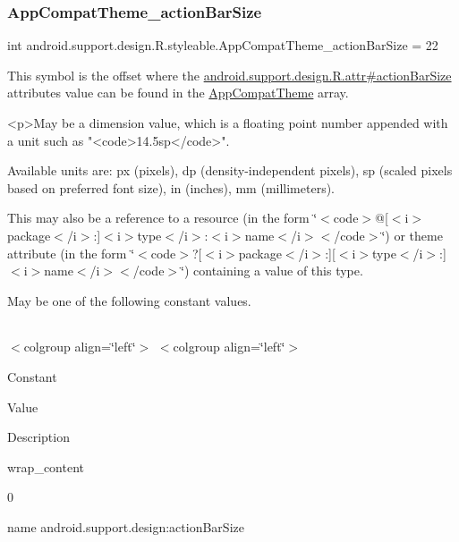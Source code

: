\subsubsection{\texorpdfstring{App\+Compat\+Theme\+\_\+action\+Bar\+Size}{AppCompatTheme\_actionBarSize}}
{\footnotesize\ttfamily int android.\+support.\+design.\+R.\+styleable.\+App\+Compat\+Theme\+\_\+action\+Bar\+Size = 22\hspace{0.3cm}{\ttfamily [static]}}

This symbol is the offset where the \hyperlink{classandroid_1_1support_1_1design_1_1R_1_1attr_ad892efeaa3b9e4b0892ccc04c1e42f6a}{android.\+support.\+design.\+R.\+attr\#action\+Bar\+Size} attribute\textquotesingle{}s value can be found in the \hyperlink{classandroid_1_1support_1_1design_1_1R_1_1styleable_afb351dc8de20cbd4c89abe360373010c}{App\+Compat\+Theme} array.

\begin{DoxyVerb}      <p>May be a dimension value, which is a floating point number appended with a unit such as "<code>14.5sp</code>".
\end{DoxyVerb}
 Available units are\+: px (pixels), dp (density-\/independent pixels), sp (scaled pixels based on preferred font size), in (inches), mm (millimeters). 

This may also be a reference to a resource (in the form \char`\"{}$<$code$>$@\mbox{[}$<$i$>$package$<$/i$>$\+:\mbox{]}$<$i$>$type$<$/i$>$\+:$<$i$>$name$<$/i$>$$<$/code$>$\char`\"{}) or theme attribute (in the form \char`\"{}$<$code$>$?\mbox{[}$<$i$>$package$<$/i$>$\+:\mbox{]}\mbox{[}$<$i$>$type$<$/i$>$\+:\mbox{]}$<$i$>$name$<$/i$>$$<$/code$>$\char`\"{}) containing a value of this type. 

May be one of the following constant values.

\tabulinesep=1mm
\begin{longtabu} spread 0pt [c]{*{0}{|X[-1]}|}
\hline
\end{longtabu}
$<$colgroup align=\char`\"{}left\char`\"{}$>$ $<$colgroup align=\char`\"{}left\char`\"{}$>$ 

Constant

Value

Description 

{\ttfamily wrap\+\_\+content}

0

name android.\+support.\+design\+:action\+Bar\+Size \mbox{\label{classandroid_1_1support_1_1design_1_1R_1_1styleable_a1bb68b5f66ea4a588bc4527379e17f79}} 
